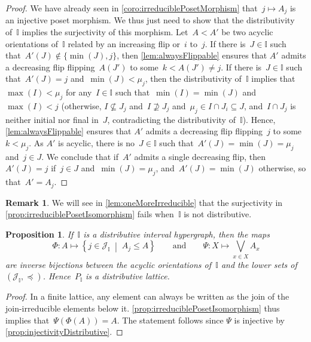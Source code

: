 \documentclass[reqno]{amsart}
\newtheorem{proposition}[theorem]{Proposition}
\theoremstyle{definition}
\newtheorem{remark}[theorem]{Remark}
\newcommand{\cal}[1]{\mathcal{#1}} %
\newcommand{\set}[2]{\left\{ #1 \;\middle|\; #2 \right\}} %
\newcommand{\bigJoin}{\bigvee} %
\newcommand{\II}{\mathbb I} %
\newcommand{\cJ}{\cal{J}} %
\begin{document}
\begin{proof}
We have already seen in \cref{coro:irreduciblePosetMorphism} that~$j \mapsto A_j$ is an injective poset morphism.
We thus just need to show that the distributivity of~$\II$ implies the surjectivity of this morphism.
Let~$A < A'$ be two acyclic orientations of~$\II$ related by an increasing flip or~$i$ to~$j$.
If there is~$J \in \II$ such that~$A'(J) \notin \{\min(J), j\}$, then \cref{lem:alwaysFlippable} ensures that $A'$ admits a decreasing flip flipping~$A(J')$ to some~$k < A(J') \ne j$.
If there is~$J \in \II$ such that~$A'(J) = j$ and~$\min(J) < \mu_j$, then the distributivity of~$\II$ implies that~$\max(I) < \mu_j$ for any~$I \in \II$ such that~$\min(I) = \min(J)$ and~$\max(I) < j$ (otherwise, $I \not\subseteq J_j$ and~$I \not\supseteq J_j$ and~$\mu_j \in I \cap J_i \subseteq J$, and~$I \cap J_j$ is neither initial nor final in~$J$, contradicting the distributivity of~$\II$).
Hence, \cref{lem:alwaysFlippable} ensures that $A'$ admits a decreasing flip flipping~$j$ to some~$k < \mu_j$.
As $A'$ is acyclic, there is no~$J \in \II$ such that~$A'(J) = \min(J) = \mu_j$ and~$j \in J$.
We conclude that if~$A'$ admits a single decreasing flip, then~$A'(J) = j$ if~$j \in J$ and~$\min(J) = \mu_j$, and~$A'(J) = \min(J)$ otherwise, so that~$A' = A_j$.
\end{proof}

\begin{remark}
We will see in \cref{lem:oneMoreIrreducible} that the surjectivity in \cref{prop:irreduciblePosetIsomorphism} fails when~$\II$ is not distributive.
\end{remark}

\begin{proposition}
\label{prop:distributiveForwardI}
If~$\II$ is a distributive interval hypergraph, then the maps
\[
\Phi : A \mapsto \set{j \in \cJ_\II}{A_j \le A}
\qquad\text{and}\qquad
\Psi : X \mapsto \bigJoin_{x \in X} A_x
\]
are inverse bijections between the acyclic orientations of~$\II$ and the lower sets of~$(\cJ_\II, \preccurlyeq)$. Hence~$P_\II$ is a distributive lattice.
\end{proposition}

\begin{proof}
In a finite lattice, any element can always be written as the join of the join-irreducible elements below it.
\cref{prop:irreduciblePosetIsomorphism} thus implies that~$\Psi(\Phi(A)) = A$.
The statement follows since $\Psi$ is injective by \cref{prop:injectivityDistributive}.
\end{proof}
\end{document}
